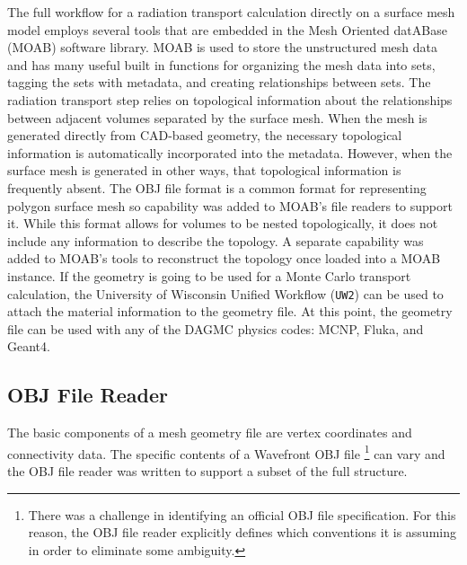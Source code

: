\documentclass{anstrans}
\begin{document}
The full workflow for a radiation transport calculation directly on a surface mesh model
employs several tools that are embedded in the Mesh Oriented datABase (MOAB) software library\cite{moab}.
MOAB is used to store the unstructured mesh data 
and has many useful built in functions for organizing the mesh data into sets, 
tagging the sets with metadata, and creating relationships between sets.  The radiation transport step relies 
on topological information about the relationships between adjacent volumes separated by the surface mesh.
When the mesh is generated directly from CAD-based geometry, the necessary topological information
is automatically incorporated into the metadata.  However, when the surface mesh is generated in other
ways, that topological information is frequently absent.  The OBJ file format\cite{obj} is a common format for
representing polygon surface mesh so capability was
added to MOAB's file readers to support it.  While this format allows for volumes to be
nested topologically, it does not include any information to describe the topology.  A separate capability
was added to MOAB's tools to reconstruct the topology once loaded into a MOAB instance.
If the geometry is going to be used 
for a Monte Carlo transport calculation, the University of Wisconsin Unified Workflow (\texttt{UW2}) can be used to attach 
the material information to the geometry file.  At this point, the geometry file
can be used with any of the DAGMC physics codes: MCNP, Fluka, and Geant4.

\subsection{OBJ File Reader}
The basic components of a mesh geometry file are vertex coordinates and connectivity data.
The specific contents of a Wavefront OBJ file \footnote{There was a challenge in identifying an official OBJ file specification.  
For this reason, the OBJ file reader explicitly defines which conventions it is assuming in order to eliminate some ambiguity.}
can vary and the OBJ file reader was written to support a subset of the full structure. 
\end{document}
